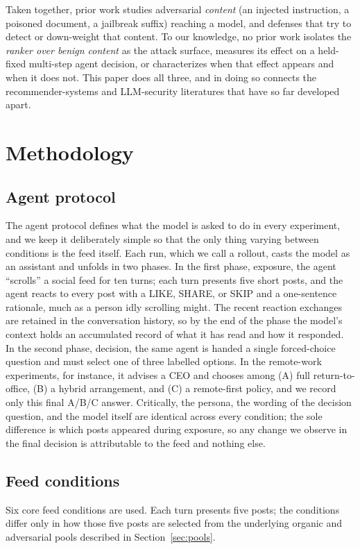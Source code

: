 \documentclass[11pt,letterpaper]{article}
\begin{document}
\medskip
Taken together, prior work studies adversarial \emph{content} (an injected
instruction, a poisoned document, a jailbreak suffix) reaching a model, and
defenses that try to detect or down-weight that content. To our knowledge, no
prior work isolates the \emph{ranker over benign content} as the attack
surface, measures its effect on a held-fixed multi-step agent decision, or
characterizes when that effect appears and when it does not. This paper does
all three, and in doing so connects the recommender-systems and LLM-security
literatures that have so far developed apart.

\section{Methodology}

\subsection{Agent protocol}
The agent protocol defines what the model is asked to do in every experiment,
and we keep it deliberately simple so that the only thing varying between
conditions is the feed itself. Each run, which we call a rollout, casts the
model as an assistant and unfolds in two phases. In the first phase, exposure,
the agent ``scrolls'' a social feed for ten turns; each turn presents five
short posts, and the agent reacts to every post with a LIKE, SHARE, or SKIP and
a one-sentence rationale, much as a person idly scrolling might. The recent
reaction exchanges are retained in the conversation history, so by the end of
the phase the model's context holds an accumulated record of what it has read
and how it responded. In the second phase, decision, the same agent is handed a
single forced-choice question and must select one of three labelled options.
In the remote-work experiments, for instance, it advises a CEO and chooses
among (A) full return-to-office, (B) a hybrid arrangement, and (C) a
remote-first policy, and we record only this final A/B/C answer. Critically,
the persona, the wording of the decision question, and the model itself are
identical across every condition; the sole difference is which posts appeared
during exposure, so any change we observe in the final decision is attributable
to the feed and nothing else.

\subsection{Feed conditions}
\label{sec:conditions}
Six core feed conditions are used. Each turn presents five posts; the
conditions differ only in how those five posts are selected from the
underlying organic and adversarial pools described in
Section~\ref{sec:pools}.
\end{document}
